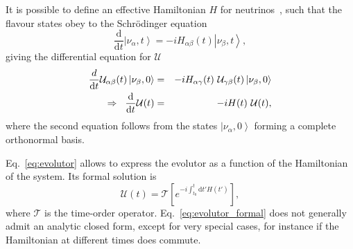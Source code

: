 \documentclass[11pt,a4paper]{article}
\newcommand{\de}[0]{\text{d}}
\newcommand{\ket}[1]{\left| #1 \right>}
\begin{document}
It is possible to define an effective Hamiltonian $H$ for neutrinos~\cite{Fantini:2018itu}, such that the flavour states obey to the Schr{\"o}dinger equation
\begin{equation}
	\frac{\de}{\de t} \ket{\nu_\alpha, t}  = - i H_{\alpha \beta}(t) \ket{\nu_\beta, t},
\end{equation}
giving the differential equation for $\mathcal{U}$
\begin{eqnarray}
 \frac{d}{\de t} \mathcal{U}_{\alpha \beta} (t) \ket{\nu_\beta, 0} &=& -i H_{\alpha \gamma}(t)\ \mathcal{U}_{\gamma \beta}(t) \ket{\nu_\beta, 0} \\
	\Rightarrow \hspace{0.2cm} \frac{\de}{\de t} \mathcal{U}(t) &=& - i H(t)\ \mathcal{U}(t), \label{eq:evolutor}
\end{eqnarray}
where the second equation follows from the states $\ket{\nu_\alpha,0}$ forming a complete orthonormal basis.

Eq.~\ref{eq:evolutor} allows to express the evolutor as a function of the Hamiltonian of the system. Its formal solution is
\begin{equation}
	\mathcal{U}(t) = \mathcal{T} \left[ e^{-i \int_{t_0}^t \de t' H(t')} \right],\label{eq:evolutor_formal}
\end{equation}
where $\mathcal{T}$ is the time-order operator. Eq.~\ref{eq:evolutor_formal} does not generally admit an analytic closed form, except for very special cases, for instance if the Hamiltonian at different times does commute.
\end{document}
